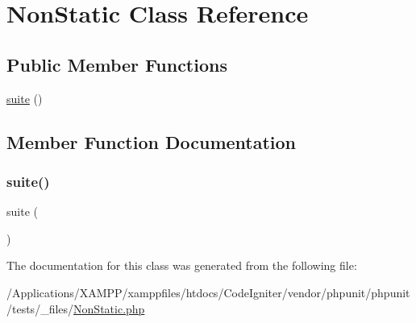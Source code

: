 \hypertarget{class_non_static}{}\section{Non\+Static Class Reference}
\label{class_non_static}
\subsection*{Public Member Functions}
\begin{DoxyCompactItemize}
\item 
\mbox{\hyperlink{class_non_static_af2b7e59bfefd4dbc0d31d6c8286b9a5e}{suite}} ()
\end{DoxyCompactItemize}


\subsection{Member Function Documentation}
\mbox{\label{class_non_static_af2b7e59bfefd4dbc0d31d6c8286b9a5e}} 
\subsubsection{\texorpdfstring{suite()}{suite()}}
{\footnotesize\ttfamily suite (\begin{DoxyParamCaption}{ }\end{DoxyParamCaption})}



The documentation for this class was generated from the following file\+:\begin{DoxyCompactItemize}
\item 
/\+Applications/\+X\+A\+M\+P\+P/xamppfiles/htdocs/\+Code\+Igniter/vendor/phpunit/phpunit/tests/\+\_\+files/\mbox{\hyperlink{_non_static_8php}{Non\+Static.\+php}}\end{DoxyCompactItemize}
